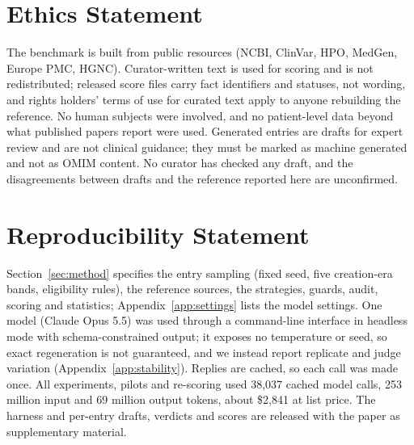 \documentclass{article} %
\begin{document}
\section*{Ethics Statement}
The benchmark is built from public resources (NCBI, ClinVar, HPO, MedGen, Europe PMC, HGNC). Curator-written text is used for scoring and is not redistributed; released score files carry fact identifiers and statuses, not wording, and rights holders' terms of use for curated text apply to anyone rebuilding the reference. No human subjects were involved, and no patient-level data beyond what published papers report were used. Generated entries are drafts for expert review and are not clinical guidance; they must be marked as machine generated and not as OMIM content. No curator has checked any draft, and the disagreements between drafts and the reference reported here are unconfirmed.

\section*{Reproducibility Statement}
Section~\ref{sec:method} specifies the entry sampling (fixed seed, five creation-era bands, eligibility rules), the reference sources, the strategies, guards, audit, scoring and statistics; Appendix~\ref{app:settings} lists the model settings. One model (Claude Opus 5.5) was used through a command-line interface in headless mode with schema-constrained output; it exposes no temperature or seed, so exact regeneration is not guaranteed, and we instead report replicate and judge variation (Appendix~\ref{app:stability}). Replies are cached, so each call was made once. All experiments, pilots and re-scoring used 38,037 cached model calls, 253 million input and 69 million output tokens, about \$2,841 at list price. The harness and per-entry drafts, verdicts and scores are released with the paper as supplementary material.




\clearpage
\appendix
\FloatBarrier
\end{document}
